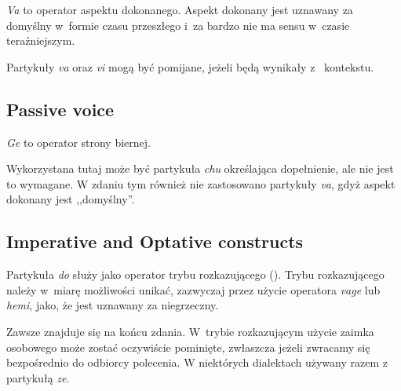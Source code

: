 
\emph{Va} to operator aspektu dokonanego. Aspekt dokonany jest uznawany za
domyślny w~formie czasu przeszłego i~za bardzo nie ma sensu w~czasie
teraźniejszym.




Partykuły \emph{va} oraz \emph{vi} mogą być pomijane, jeżeli będą wynikały z~
kontekstu.

\subsection{Passive voice}

\emph{Ge} to operator strony biernej.


Wykorzystana tutaj może być partykuła \emph{chu} określająca dopełnienie, ale
nie jest to wymagane. W zdaniu tym również nie zastosowano partykuły \emph{va},
gdyż aspekt dokonany jest ,,domyślny''.

\subsection{Imperative and Optative constructs}

Partykuła \emph{do} służy jako operator trybu rozkazującego (\Imp{}). Trybu
rozkazującego należy w~miarę możliwości unikać, zazwyczaj przez użycie operatora
\emph{vage} lub \emph{hemi}, jako, że jest uznawany za niegrzeczny.

Zawsze znajduje się na końcu zdania. W~trybie rozkazującym użycie zaimka
osobowego może zostać oczywiście pominięte, zwłaszcza jeżeli zwracamy się
bezpośrednio do odbiorcy polecenia. W niektórych dialektach używany razem z
partykułą \emph{ze}.


